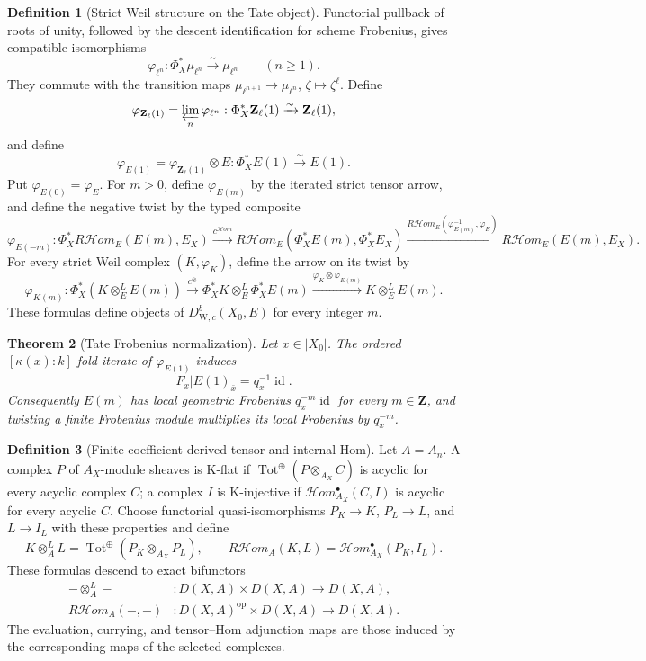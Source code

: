 \documentclass[10pt]{article}
\newtheorem{theorem}{Theorem}[section]
\theoremstyle{definition}
\newtheorem{definition}[theorem]{Definition}
\newcommand{\WeilD}{D^b_{\mathrm W,c}}
\newcommand{\RHom}{R\mathcal Hom}
\begin{document}
\begin{definition}[Strict Weil structure on the Tate object]
Functorial pullback of roots of unity, followed by the descent
identification for scheme Frobenius, gives compatible isomorphisms
\[
 \varphi_{\ell^n}:\Phi_X^*\mu_{\ell^n}
                         \xrightarrow{\sim}\mu_{\ell^n}
 \qquad(n\ge1).
\]
They commute with the transition maps
\(\mu_{\ell^{n+1}}\to\mu_{\ell^n}\), \(\zeta\mapsto\zeta^\ell\).
Define
\[
 \varphi_{\mathbf Z_\ell(1)}
   =\varprojlim_n\varphi_{\ell^n}:
 \Phi_X^*\mathbf Z_\ell(1)\xrightarrow{\sim}\mathbf Z_\ell(1),
\]
and define
\[
 \varphi_{E(1)}=\varphi_{\mathbf Z_\ell(1)}\otimes E:
                  \Phi_X^*E(1)\xrightarrow{\sim}E(1).
\]
Put \(\varphi_{E(0)}=\varphi_E\).  For \(m>0\), define
\(\varphi_{E(m)}\) by the iterated strict tensor arrow, and define the
negative twist by the typed composite
\[
 \varphi_{E(-m)}:\Phi_X^*\RHom_E(E(m),E_X)
 \xrightarrow{c^{\mathcal Hom}}
 \RHom_E(\Phi_X^*E(m),\Phi_X^*E_X)
 \xrightarrow{\RHom_E(\varphi_{E(m)}^{-1},\varphi_E)}
 \RHom_E(E(m),E_X).
\]
For every strict Weil complex \((K,\varphi_K)\), define the arrow on its
twist by
\[
 \varphi_{K(m)}:\Phi_X^*(K\otimes_E^LE(m))
 \xrightarrow{c^\otimes}
 \Phi_X^*K\otimes_E^L\Phi_X^*E(m)
 \xrightarrow{\varphi_K\otimes\varphi_{E(m)}}K\otimes_E^LE(m).
\]
These formulas define objects of \(\WeilD(X_0,E)\) for every integer
\(m\).
\end{definition}

\begin{theorem}[Tate Frobenius normalization]
Let \(x\in|X_0|\).  The ordered
\([\kappa(x):k]\)-fold iterate of \(\varphi_{E(1)}\) induces
\[
               F_x|E(1)_{\bar x}=q_x^{-1}\operatorname{id}.
\]
Consequently \(E(m)\) has local geometric Frobenius
\(q_x^{-m}\operatorname{id}\) for every \(m\in\mathbf Z\), and twisting a
finite Frobenius module multiplies its local Frobenius by \(q_x^{-m}\).
\end{theorem}

\begin{definition}[Finite-coefficient derived tensor and internal Hom]
Let \(A=A_n\).  A complex \(P\) of \(A_X\)-module sheaves is K-flat if
\(\operatorname{Tot}^{\oplus}(P\otimes_{A_X}C)\) is acyclic for every
acyclic complex \(C\); a complex \(I\) is K-injective if
\(\mathcal Hom_{A_X}^\bullet(C,I)\) is acyclic for every acyclic
\(C\).  Choose functorial quasi-isomorphisms
\(P_K\to K\), \(P_L\to L\), and \(L\to I_L\) with these properties and define
\[
 K\otimes_A^LL=\operatorname{Tot}^{\oplus}(P_K\otimes_{A_X}P_L),
 \qquad
 R\mathcal Hom_A(K,L)=\mathcal Hom_{A_X}^\bullet(P_K,I_L).
\]
These formulas descend to exact bifunctors
\[
 \begin{aligned}
 -\otimes_A^L- &:D(X,A)\times D(X,A)\longrightarrow D(X,A),\\
 R\mathcal Hom_A(-,-)&:D(X,A)^{\mathrm{op}}\times D(X,A)
                          \longrightarrow D(X,A).
 \end{aligned}
\]
The evaluation, currying, and tensor--Hom adjunction maps are those induced
by the corresponding maps of the selected complexes.
\end{definition}
\end{document}
